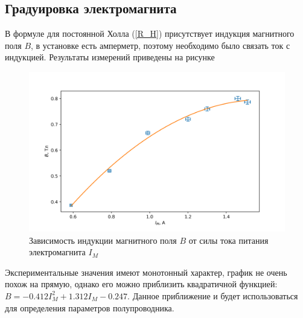 \documentclass[a4paper,12pt]{article} %
\begin{document}
\subsection*{Градуировка электромагнита}
В формуле для постоянной Холла (\ref{R_H}) присутствует индукция магнитного поля $B$, в установке есть амперметр, поэтому необходимо было связать ток с индукцией. 
Результаты измерений приведены на рисунке
\begin{figure}[h!]
\begin{center}
\includegraphics[width=\textwidth]{Градуировка}
\caption{Зависимость индукции магнитного поля $B$ от силы тока питания электромагнита $I_M$} \label{градуировка}
\end{center}
\end{figure} 
Экспериментальные значения имеют монотонный характер, график не очень похож на прямую, однако его можно приблизить квадратичной функцией: $B =  -0.412 I_M ^ 2 +1.312 I_M - 0.247$. Данное приближение и будет использоваться для определения параметров полупроводника. 
\end{document}

